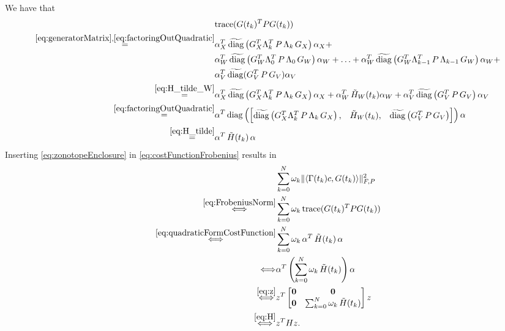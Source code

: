 \documentclass[EPiC]{easychair}
\renewcommand{\^}[1]{^{(#1)}}
\begin{document}
We have that
\begin{equation} \label{eq:quadraticFormCostFunction}
\begin{split}
 & \mathrm{trace}(G(t_k)^T P G(t_k)) \\
 \overset{\eqref{eq:generatorMatrix}, \eqref{eq:factoringOutQuadratic}}{=}& \alpha_X^T \, \widetilde{\mathrm{diag}}\left(G_X^T \Lambda_k^T \, P \, \Lambda_k  \, G_X \right) \alpha_X + \\
 & \alpha_W^T \, \widetilde{\mathrm{diag}}\left(G_W^T \Lambda_0^T \, P \, \Lambda_0  \, G_W \right) \alpha_W + \ldots + \alpha_W^T \, \widetilde{\mathrm{diag}}\left(G_W^T \Lambda_{k-1}^T \, P \, \Lambda_{k-1}  \, G_W \right) \alpha_W + \\
 & \alpha_V^T \, \widetilde{\mathrm{diag}}(G_V^T \, P \, G_V) \alpha_V \\
 \overset{\eqref{eq:H_tilde_W}}{=}& \alpha_X^T \, \widetilde{\mathrm{diag}}\left(G_X^T \Lambda_k^T \, P \, \Lambda_k  \, G_X \right) \alpha_X + \alpha_W^T \, \tilde{H}_W(t_k) \alpha_W + \alpha_V^T \, \widetilde{\mathrm{diag}}\left(G_V^T \, P \, G_V \right) \alpha_V \\
 \overset{\eqref{eq:factoringOutQuadratic}}{=}& 
 \alpha^T \, \mathrm{diag}\left(\begin{bmatrix} 
  \widetilde{\mathrm{diag}}\left(G_X^T \Lambda_k^T \, P \, \Lambda_k  \, G_X \right), &
  \tilde{H}_W(t_k), &
  \widetilde{\mathrm{diag}}\left(G_V^T \, P \, G_V \right)\end{bmatrix} \right) \alpha \\
 \overset{\eqref{eq:H_tilde}}{=} & \alpha^T \, \tilde{H}(t_k)  \, \alpha
 \end{split}
\end{equation}
Inserting \eqref{eq:zonotopeEnclosure} in \eqref{eq:costFunctionFrobenius} results in
 \begin{align*} 
    & \sum_{k=0}^{N} \omega_k \| \langle \Gamma(t_k) c, G(t_k) \rangle \|_{F,P}^2 \\
    \overset{\eqref{eq:FrobeniusNorm}}{\Longleftrightarrow} & \sum_{k=0}^{N} \omega_k \, \mathrm{trace}(G(t_k)^T P G(t_k)) \\
    \overset{\eqref{eq:quadraticFormCostFunction}}{\Longleftrightarrow} & \sum_{k=0}^{N} \omega_k \, \alpha^T \, \tilde{H}(t_k)  \, \alpha \\
    {\Longleftrightarrow} & \alpha^T \left(\sum_{k=0}^{N} \omega_k \, \tilde{H}(t_k)  \right) \alpha \\
    \overset{\eqref{eq:z}}{\Longleftrightarrow} & z^T \begin{bmatrix} \mathbf{0} & \mathbf{0} \\
    \mathbf{0} & \sum_{k=0}^{N} \omega_k \, \tilde{H}(t_k) \end{bmatrix}  z \\
    \overset{\eqref{eq:H}}{\Longleftrightarrow} & z^T H z.
 \end{align*}
\end{document}
